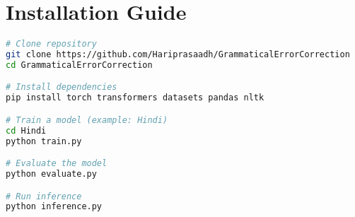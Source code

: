\documentclass[12pt,a4paper]{article}
\begin{document}
\section{Installation Guide}

\begin{lstlisting}[language=bash, caption=Installation Commands]
# Clone repository
git clone https://github.com/Hariprasaadh/GrammaticalErrorCorrection
cd GrammaticalErrorCorrection

# Install dependencies
pip install torch transformers datasets pandas nltk

# Train a model (example: Hindi)
cd Hindi
python train.py

# Evaluate the model
python evaluate.py

# Run inference
python inference.py
\end{lstlisting}
\end{document}
